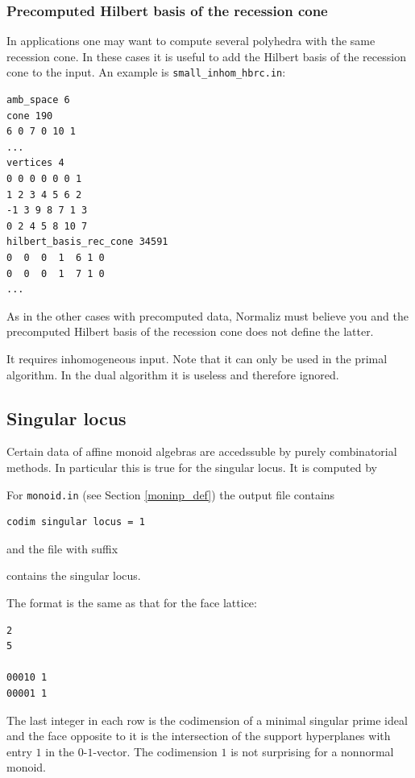 \subsubsection{Precomputed Hilbert basis of the recession cone}\label{HB_rec_cone}

In applications one may want to compute several polyhedra with the same recession cone. In these cases it is useful to add the Hilbert basis of the recession cone to the input. An example is \verb|small_inhom_hbrc.in|:
\begin{Verbatim}
amb_space 6
cone 190
6 0 7 0 10 1
...
vertices 4
0 0 0 0 0 0 1
1 2 3 4 5 6 2
-1 3 9 8 7 1 3
0 2 4 5 8 10 7
hilbert_basis_rec_cone 34591
0  0  0  1  6 1 0
0  0  0  1  7 1 0
...
\end{Verbatim}
As in the other cases with precomputed data, Normaliz must believe you and the precomputed Hilbert basis of the recession cone does not define the latter.

It requires inhomogeneous input. Note that it can only be used in the primal algorithm. In the dual algorithm it is useless and therefore ignored.

\subsection{Singular locus}\label{SingularLocus}

Certain data of affine monoid algebras are accedssuble by purely combinatorial methods. In particular this is true for the singular locus. It is computed by
\begin{itemize}
	\itemtt[SingularLocus]
\end{itemize}
For \verb|monoid.in| (see Section \ref{moninp_def}) the output file contains
\begin{Verbatim}
codim singular locus = 1
\end{Verbatim}
and the file with suffix
\begin{itemize}
	\itemtt[sng] contains the singular locus.
\end{itemize}
The format is the same as that for the face lattice:
\begin{Verbatim}
2
5

00010 1
00001 1
\end{Verbatim}
The last integer in each row is the codimension of a minimal singular prime ideal and the face opposite to it is the intersection of the support hyperplanes with entry $1$ in the $0$-$1$-vector. The codimension $1$ is not surprising for a nonnormal monoid.


